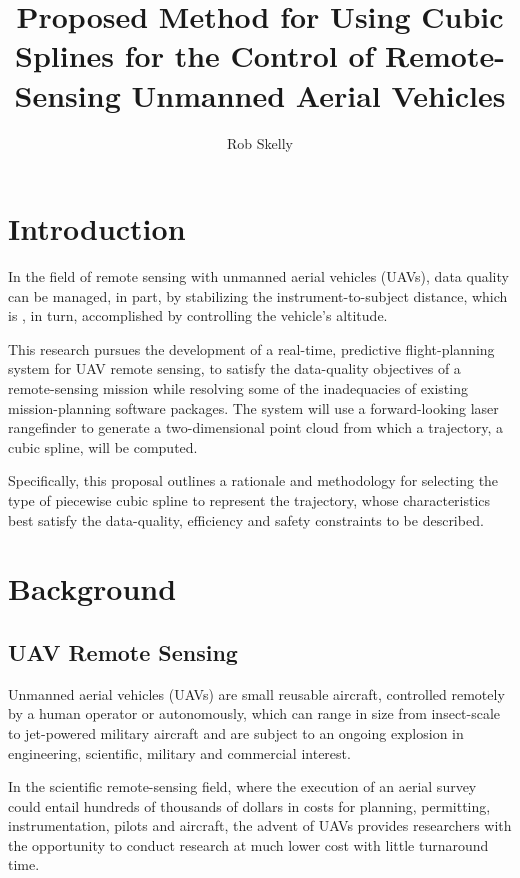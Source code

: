 \documentclass[doc]{apa6}
\title{Proposed Method for Using Cubic Splines for the Control of Remote-Sensing Unmanned Aerial Vehicles}
\author{Rob Skelly}
\affiliation{University of Victoria}
\begin{document}
\maketitle



\section{Introduction}

In the field of remote sensing with unmanned aerial vehicles (UAVs), data quality can be managed, in part, by stabilizing the instrument-to-subject distance, which is , in turn, accomplished by controlling the vehicle's altitude. 


This research pursues the development of a real-time, predictive flight-planning system for UAV remote sensing, to satisfy the data-quality objectives of a remote-sensing mission while resolving some of the inadequacies of existing mission-planning software packages. The system will use a forward-looking laser rangefinder to generate a two-dimensional point cloud from which a trajectory, a cubic spline, will be computed. 


Specifically, this proposal outlines a rationale and methodology for selecting the type of piecewise cubic spline to represent the trajectory, whose characteristics best satisfy the data-quality, efficiency and safety constraints to be described.  

\section{Background}

\subsection{UAV Remote Sensing}

Unmanned aerial vehicles (UAVs) are small reusable aircraft, controlled remotely by a human operator or autonomously, which can range in size from insect-scale to jet-powered military aircraft \parencite{Avadhanula2002,Deng2003} and are subject to an ongoing explosion in engineering, scientific, military and commercial interest. 

In the scientific remote-sensing field, where the execution of an aerial survey could entail hundreds of thousands of dollars in costs for planning, permitting, instrumentation, pilots and aircraft, the advent of UAVs provides researchers with the opportunity to conduct research at much lower cost with little turnaround time. 
\end{document}
